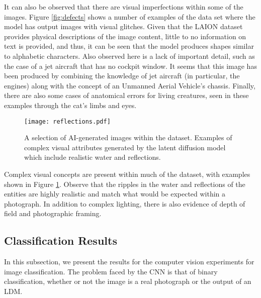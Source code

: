 \documentclass{article}
\begin{document}
It can also be observed that there are visual imperfections within some of the images. Figure \ref{fig:defects} shows a number of examples of the data set where the model has output images with visual glitches. Given that the LAION dataset provides physical descriptions of the image content, little to no information on text is provided, and thus, it can be seen that the model produces shapes similar to alphabetic characters. Also observed here is a lack of important detail, such as the case of a jet aircraft that has no cockpit window. It seems that this image has been produced by combining the knowledge of jet aircraft (in particular, the engines) along with the concept of an Unmanned Aerial Vehicle's chassis. Finally, there are also some cases of anatomical errors for living creatures, seen in these examples through the cat's limbs and eyes. 

\begin{figure}
    \centering
    \texttt{[image: reflections.pdf]}
    \caption{A selection of AI-generated images within the dataset. Examples of complex visual attributes generated by the latent diffusion model which include realistic water and reflections. }
    \label{fig:reflections}
\end{figure}

Complex visual concepts are present within much of the dataset, with examples shown in Figure \ref{fig:reflections}. Observe that the ripples in the water and reflections of the entities are highly realistic and match what would be expected within a photograph. In addition to complex lighting, there is also evidence of depth of field and photographic framing.



\subsection{Classification Results}
In this subsection, we present the results for the computer vision experiments for image classification. The problem faced by the CNN is that of binary classification, whether or not the image is a real photograph or the output of an LDM. 
\end{document}
